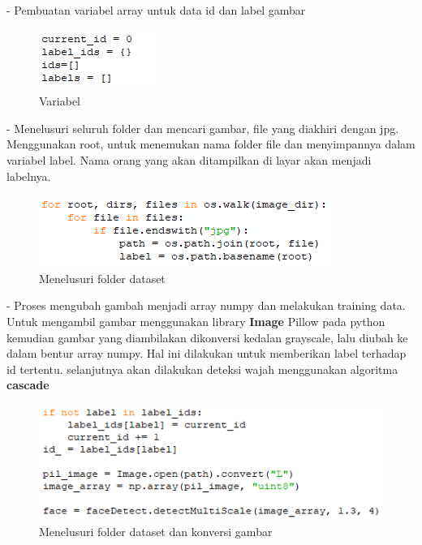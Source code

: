 \begin{enumerate}
    - Pembuatan variabel array untuk data id dan label gambar
    \begin{figure}[h!]
        \centering
        \includegraphics[width=0.3\linewidth]{images/fr_cam9.PNG}
        \caption{Variabel }
    \end{figure}

    \newpage
    - Menelusuri seluruh folder dan mencari gambar, file yang diakhiri 
    dengan jpg. Menggunakan root, untuk menemukan nama folder file dan menyimpannya dalam variabel label. 
    Nama orang yang akan ditampilkan di layar akan menjadi labelnya.
    \begin{figure}[h!]
        \centering
        \includegraphics[width=0.7\linewidth]{images/fr_cam10.PNG}
        \caption{Menelusuri folder dataset }
    \end{figure}

    - Proses mengubah gambah menjadi array numpy dan melakukan training data. Untuk mengambil gambar menggunakan library 
    \textbf{Image} Pillow pada python kemudian gambar yang diambilakan dikonversi kedalan grayscale, lalu diubah ke dalam bentur array numpy. 
    Hal ini dilakukan untuk memberikan label terhadap id tertentu. selanjutnya akan dilakukan deteksi wajah menggunakan algoritma \textbf{cascade}
    \begin{figure}[h!]
        \centering
        \includegraphics[width=0.8\linewidth]{images/fr_cam11.PNG}
        \caption{Menelusuri folder dataset dan konversi gambar}
    \end{figure}


\end{enumerate}
